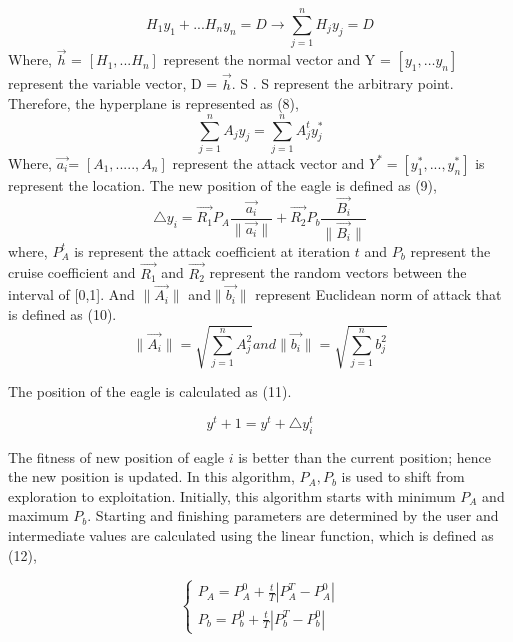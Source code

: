 \documentclass[conference]{IEEEtran}
\begin{document}
\begin{equation}
H_1y_1 + ... H_ny_n = D \rightarrow \sum^{n}_{j=1} H_jy_j = D
\end{equation}
Where, $\overrightarrow{h}$ = $[H_1, ... H_n]$ represent the normal vector and Y = $[y_1, … y_n]$ represent the variable vector,
D = $\overrightarrow{h}$. S . S represent the arbitrary point. Therefore, the hyperplane is represented as (8),
\begin{equation}
\sum^{n}_{j=1} A_jy_j = \sum^{n}_{j=1} A^t_jy^*_j
\end{equation}
Where, $\overrightarrow{a_i}$= $[A_1, ... . . , A_n]$ represent the attack vector and $Y^* = [y^*_1, ..., y^*_n]$ is represent the location. The new position of the eagle is defined as (9),
\begin{equation}
\triangle y_i  = \overrightarrow{R_1}P_A \frac{\overrightarrow{a_i}}{\|\overrightarrow{a_i}\|} + \overrightarrow{R_2}P_b \frac{\overrightarrow{B_i}}{\|\overrightarrow{B_i}\|}
\end{equation}
where, $P^t_A$ is represent the attack coefficient at iteration $t$ and $P_b$ represent the cruise coefficient and  $\overrightarrow{R_1}$ and $\overrightarrow{R_2}$ represent the random vectors between the interval of [0,1]. And $\|\overrightarrow{A_i}\|$ and$\|\overrightarrow{b_i}\|$ represent Euclidean norm
of attack that is defined as (10).
\begin{equation}
\|\overrightarrow{A_i}\| = \sqrt{ \sum^{n}_{j=1} A^2_j }  and  \|\overrightarrow{b_i}\| = \sqrt{ \sum^{n}_{j=1} b^2_j }
\end{equation}

The position of the eagle is calculated as (11).

\begin{equation}
y^t+1 = y^t + \triangle y^t_i
\end{equation}

The fitness of new position of eagle $i$ is better than the current position; hence the new position is updated.
In this algorithm, $P_A, P_b$ is used to shift from exploration to exploitation. Initially, this algorithm
starts with minimum $P_A$ and maximum $P_b$. Starting and finishing parameters are determined by the user and
intermediate values are calculated using the linear function, which is defined as (12),

\begin{equation}
\begin{cases}
	P_A  = P^0_A + \frac{t}{T}|P^T_A - P^0_A | \\
	P_b  = P^0_b + \frac{t}{T}|P^T_b - P^0_b  |
\end{cases}
\end{equation}
\end{document}
